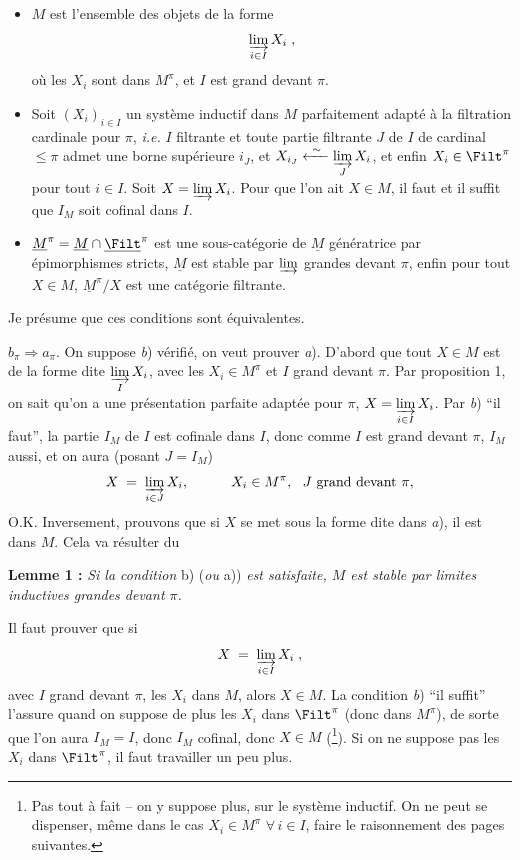 \begin{itemize}
\item[\circled{a$_\pi$}] $M$ est l'ensemble des objets de la forme
\[
\varinjlim_{i\in I} X_i \;,
\]
où les $X_i$ sont dans $M^\pi$, et $I$ est grand devant $\pi$.
\end{itemize}


\begin{itemize}
\item[\circled{b$_\pi$}] Soit $(X_i)_{i\in I}$ un système inductif dans $M$ parfaitement adapté à la filtration cardinale pour $\pi$, \textit{i.e.} $I$ filtrante et toute partie filtrante $J$ de $I$ de cardinal $\le\pi$ admet une borne supérieure $i_J$, et $X_{i_J}\xleftarrow{\ \sim\ }\varinjlim\limits_{J} X_i$, et enfin $X_i\in\Filt^\pi$ pour tout $i\in I$. Soit $X=\varinjlim X_i$. Pour que l'on ait $X\in M$, il faut et il suffit que $I_M$ soit cofinal dans $I$.
\item[\circled{c$_\pi$}] $\underline{M}^\pi=\underline{M}\cap\underline{\Filt}^\pi$ est une sous-catégorie de $\underline{M}$ génératrice par épimorphismes stricts, $\underline{M}$ est stable par $\varinjlim$ grandes devant $\pi$, enfin pour tout $X\in M$, $\underline{M}^\pi/X$ est une catégorie filtrante.
\end{itemize}

Je présume que ces conditions sont équivalentes.

$b_\pi\Longrightarrow a_\pi$. On suppose \textit{b}) vérifié, on veut prouver \textit{a}). D'abord que tout $X\in M$ est de la forme dite $\varinjlim\limits_{I} X_i$, avec les $X_i\in M^\pi$ et $I$ grand devant $\pi$. Par proposition 1, on sait qu'on a une présentation parfaite adaptée pour $\pi$, $X=\varinjlim\limits_{i\in I} X_i$. Par \textit{b}) “il faut”, la partie $I_M$ de $I$ est cofinale dans $I$, donc comme $I$ est grand devant $\pi$, $I_M$ aussi, et on aura (posant $J=I_M$)
\[
X \;=\; \varinjlim_{i\in J} X_i, \qquad\quad X_i\in M^\pi,\ \ J \text{ grand devant } \pi,
\]
O.K. Inversement, prouvons que si $X$ se met sous la forme dite dans \textit{a}), il est dans $M$. Cela va résulter du

\textbf{Lemme 1 :} \textit{Si la condition} b) (\textit{ou} a)) \textit{est satisfaite, $M$ est stable par limites inductives grandes devant $\pi$.}

Il faut prouver que si
\[
X \;=\; \varinjlim_{i\in I} X_i \;,
\]
avec $I$ grand devant $\pi$, les $X_i$ dans $M$, alors $X\in M$. La condition \textit{b}) “il suffit” l'assure quand on suppose de plus les $X_i$ dans $\Filt^\pi$ (donc dans $M^\pi$), de sorte que l'on aura $I_M=I$, donc $I_M$ cofinal, donc $X\in M$ (\footnote[42]{Pas tout à fait – on y suppose plus, sur le système inductif. On ne peut se dispenser, même dans le cas $X_i\in M^\pi$ $\forall\, i\in I$, faire le raisonnement des pages suivantes.}). Si on ne suppose pas les $X_i$ dans $\Filt^\pi$, il faut travailler un peu plus.

